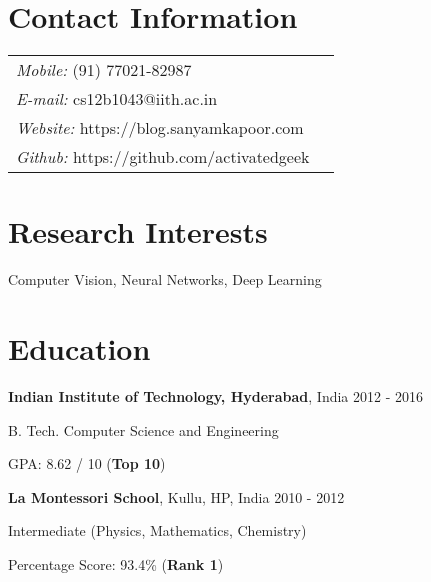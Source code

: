 \documentclass[margin,line]{res}
\newenvironment{list1}{
  \begin{list}{\ding{113}}{%
    \setlength{\itemsep}{0in}
    \setlength{\parsep}{0in} \setlength{\parskip}{0in}
    \setlength{\topsep}{0in} \setlength{\partopsep}{0in}
    \setlength{\leftmargin}{0.17in}}}{\end{list}}
\begin{document}

\begin{resume}

\section{\sc Contact Information}
  \vspace{.05in}
  \begin{tabular}{@{}p{2.9in}p{4in}}

	{\it Mobile:}  (91) 77021-82987 \\
	{\it E-mail:}  cs12b1043@iith.ac.in\\
	{\it Website:} https://blog.sanyamkapoor.com \\
	{\it Github:} https://github.com/activatedgeek \\

  \end{tabular}

\section{\sc Research Interests}
  Computer Vision, Neural Networks, Deep Learning

\section{\sc Education}
  {\bf Indian Institute of Technology, Hyderabad}, India \hfill 2012 - 2016 \\
  \vspace*{-.1in}
  \begin{list1}
	\item[] B. Tech. Computer Science and Engineering
	\item[] GPA: 8.62 / 10 ({\bf Top 10})
  \end{list1}

  \vspace*{-2.5mm}

  {\bf La Montessori School}, Kullu, HP, India \hfill 2010 - 2012 \\
  \vspace*{-.1in}
  \begin{list1}
  	\item[] Intermediate (Physics, Mathematics, Chemistry)
	\item[] Percentage Score: 93.4\% ({\bf Rank 1})
  \end{list1}


\end{resume}
\end{document}
